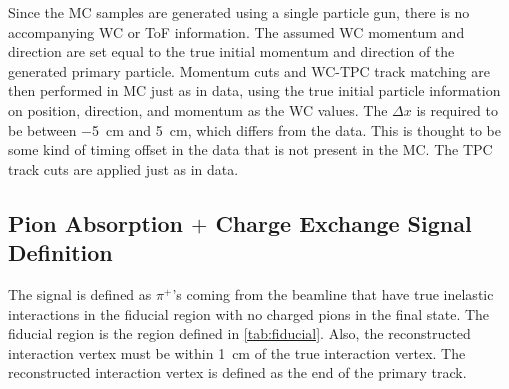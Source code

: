 \documentclass[letterpaper,12pt]{article}
\newcommand{\pip}{\ensuremath{\pi^{+}}}
\begin{document}
\begin{table}[!hbtp]
  \begin{center}
    \small
    \caption{Wire chamber track to TPC track matching cuts.}
    \label{tab:WCTPCMatching}
  \end{center}
\end{table}

Since the MC samples are generated using a single particle gun, there is no
accompanying WC or ToF information. The assumed WC momentum and direction are
set equal to the true initial momentum and direction of the generated primary
particle. Momentum cuts and WC-TPC track matching are then performed in MC just
as in data, using the true initial particle information on position, direction,
and momentum as the WC values. The $\Delta x$ is required to be between
\SI{-5}{\cm} and \SI{5}{\cm}, which differs from the data. This is thought to
be some kind of timing offset in the data that is not present in the MC. The
TPC track cuts are applied just as in data.

\subsection{Pion Absorption $+$ Charge Exchange Signal Definition}

The signal is defined as \pip{}'s coming from the beamline that have true
inelastic interactions in the fiducial region with no charged pions in the
final state. The fiducial region is the region defined in \cref{tab:fiducial}.
Also, the reconstructed interaction vertex must be within \SI{1}{\cm} of the
true interaction vertex.  The reconstructed interaction vertex is defined as
the end of the primary track.
\end{document}
